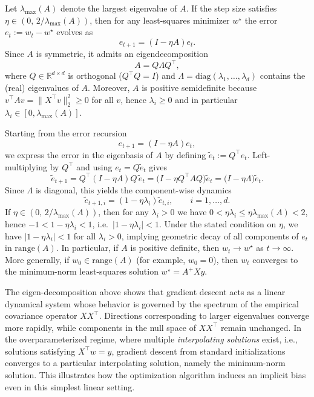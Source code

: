 Let $\lambda_{\max}(A)$ denote the largest eigenvalue of $A$.
If the step size satisfies $\eta \in (0,\,2/\lambda_{\max}(A))$, then for any
least-squares minimizer $w^\star$ the error $e_t := w_t - w^\star$ evolves as
\begin{equation}
	e_{t+1} = (I - \eta A) e_t .
\end{equation}
Since $A$ is symmetric, it admits an eigendecomposition
\[
	A = Q\Lambda Q^\top,
\]
where $Q\in\mathbb{R}^{d\times d}$ is orthogonal ($Q^\top Q = I$) and
$\Lambda=\mathrm{diag}(\lambda_1,\dots,\lambda_d)$ contains the (real) eigenvalues
of $A$. Moreover, $A$ is positive semidefinite because
$v^\top A v = \|X^\top v\|_2^2 \ge 0$ for all $v$, hence $\lambda_i \ge 0$ and in
particular $\lambda_i \in [0,\lambda_{\max}(A)]$.

Starting from the error recursion
\[
	e_{t+1} = (I-\eta A)e_t,
\]
we express the error in the eigenbasis of $A$ by defining $\tilde e_t := Q^\top e_t$.
Left-multiplying by $Q^\top$ and using $e_t = Q\tilde e_t$ gives
\[
	\tilde e_{t+1}
	= Q^\top (I-\eta A) Q \,\tilde e_t
	= \bigl(I - \eta Q^\top A Q\bigr)\tilde e_t
	= \bigl(I - \eta \Lambda\bigr)\tilde e_t.
\]
Since $\Lambda$ is diagonal, this yields the component-wise dynamics
\begin{equation}\label{eq:componentwise-dynamics}
	\tilde e_{t+1,i} = (1-\eta \lambda_i)\tilde e_{t,i}, \qquad i=1,\dots,d.
\end{equation}
If $\eta \in (0,\,2/\lambda_{\max}(A))$, then for any $\lambda_i>0$ we have
$0<\eta\lambda_i \le \eta\lambda_{\max}(A) < 2$, hence
$-1 < 1-\eta\lambda_i < 1$, i.e.\ $|1-\eta\lambda_i|<1$.
Under the stated condition on $\eta$, we have $|1 - \eta \lambda_i| < 1$ for all
$\lambda_i > 0$, implying geometric decay of all components of $e_t$ in
$\mathrm{range}(A)$. In particular, if $A$ is positive definite, then
$w_t \to w^\star$ as $t \to \infty$. More generally, if $w_0 \in \mathrm{range}(A)$
(for example, $w_0 = 0$), then $w_t$ converges to the minimum-norm least-squares
solution $w^\star = A^{+}Xy$.

The eigen-decomposition above shows that gradient descent acts as a linear
dynamical system whose behavior is governed by the spectrum of the empirical
covariance operator $XX^\top$. Directions corresponding to larger eigenvalues
converge more rapidly, while components in the null space of $XX^\top$ remain
unchanged. In the overparameterized regime, where multiple \emph{interpolating
	solutions} exist, i.e., solutions satisfying $X^\top w = y$, gradient descent from
standard initializations converges to a particular interpolating solution,
namely the minimum-norm solution. This illustrates how the optimization algorithm
induces an implicit bias even in this simplest linear setting.

